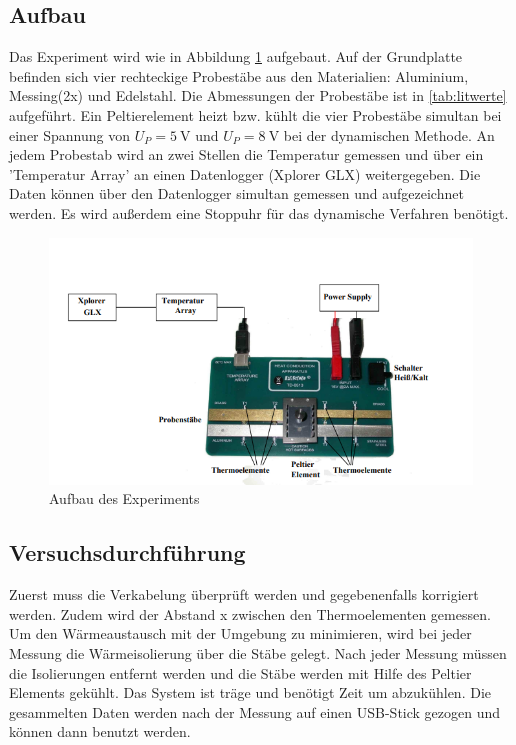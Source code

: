 \subsection{Aufbau}
Das Experiment wird wie in Abbildung \ref{fig:aufbau} aufgebaut. Auf der Grundplatte befinden sich vier rechteckige Probestäbe aus den Materialien:
Aluminium, Messing(2x) und Edelstahl. Die Abmessungen der Probestäbe ist in \ref{tab:litwerte} aufgeführt.
Ein Peltierelement heizt bzw. kühlt die vier Probestäbe simultan bei einer Spannung von $U_P=\SI{5}{\volt}$
und $U_P=\SI{8}{\volt}$ bei der dynamischen Methode. An jedem Probestab wird an zwei Stellen die Temperatur gemessen und über ein 'Temperatur Array'
an einen Datenlogger (Xplorer GLX) weitergegeben. Die Daten können über den Datenlogger simultan gemessen und aufgezeichnet werden. 
Es wird außerdem eine Stoppuhr für das dynamische Verfahren benötigt.
\begin{figure}
    \centering
    \includegraphics[scale=0.7]{Aufbau.pdf}
    \caption{Aufbau des Experiments}
    \label{fig:aufbau}
\end{figure}
\subsection{Versuchsdurchführung}
\label{sec:Vdurch}
Zuerst muss die Verkabelung überprüft werden und gegebenenfalls korrigiert werden. 
Zudem wird der Abstand x zwischen den Thermoelementen gemessen.
Um den Wärmeaustausch mit der Umgebung zu minimieren, wird bei jeder
Messung die Wärmeisolierung über die Stäbe gelegt. Nach jeder Messung müssen die Isolierungen entfernt werden und die Stäbe werden mit Hilfe des Peltier Elements gekühlt.
Das System ist träge und benötigt Zeit um abzukühlen. Die gesammelten Daten werden nach der Messung auf einen USB-Stick gezogen und können dann benutzt werden.\\
